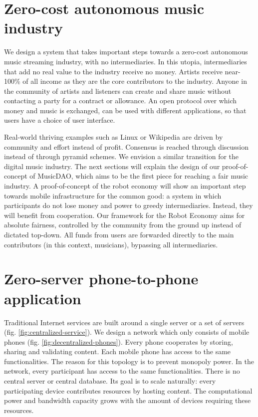 \section{Zero-cost autonomous music industry}
We design a system that takes important steps towards a zero-cost autonomous music streaming industry, with no intermediaries. In this utopia, intermediaries that add no real value to the industry receive no money. Artists receive near-100\% of all income as they are the core contributors to the industry. Anyone in the community of artists and listeners can create and share music without contacting a party for a contract or allowance. An open protocol over which money and music is exchanged, can be used with different applications, so that users have a choice of user interface. 

Real-world thriving examples such as Linux or Wikipedia are driven by community and effort instead of profit. Consensus is reached through discussion instead of through pyramid schemes. We envision a similar transition for the digital music industry. The next sections will explain the design of our proof-of-concept of MusicDAO, which aims to be the first piece for reaching a fair music industry. A proof-of-concept of the robot economy will show an important step towards mobile infrastructure for the common good: a system in which participants do not lose money and power to greedy intermediaries. Instead, they will benefit from cooperation. Our framework for the Robot Economy aims for absolute fairness, controlled by the community from the ground up instead of dictated top-down. All funds from users are forwarded directly to the main contributors (in this context, musicians), bypassing all intermediaries.

\section{Zero-server phone-to-phone application}
Traditional Internet services are built around a single server or a set of servers (fig. \ref{fig:centralized-service}). We design a network which only consists of mobile phones (fig. \ref{fig:decentralized-phones}). Every phone cooperates by storing, sharing and validating content. Each mobile phone has access to the same functionalities. The reason for this topology is to prevent monopoly power. In the network, every participant has access to the same functionalities. There is no central server or central database. Its goal is to scale naturally: every participating device contributes resources by hosting content. The computational power and bandwidth capacity grows with the amount of devices requiring these resources.

